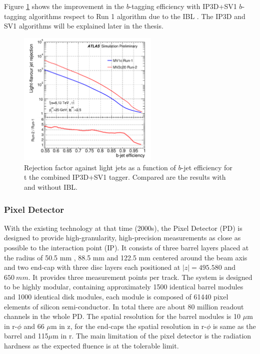 Figure \ref{fig:chap2:ATLAS:ITK:IBL:Btag} shows the improvement in the $b$-tagging efficiency with IP3D+SV1 $b$-tagging algorithms respect to Run 1 algorithm due to the IBL \cite{IBL_Btag, IBL_Btag2}. The IP3D and SV1 algorithms will be explained later in the thesis.
\begin{figure}[htbp]
    \centering
    \includegraphics[width=0.6\textwidth]{Ch2/Img/IBL_btag2.png}
    \caption{Rejection factor against light jets as a function of $b$-jet efficiency for t the combined IP3D+SV1 tagger. Compared are the results with and without IBL.}
    \label{fig:chap2:ATLAS:ITK:IBL:Btag}
\end{figure}
\subsubsection{Pixel Detector}
\label{chap2:ATLAS:ITK:PD}
With the existing technology at that time (2000s), the Pixel Detector (PD) is designed to provide high-granularity, high-precision measurements as close as possible to the interaction point (IP). It consists of three barrel layers placed at the radius of 50.5 mm , 88.5 mm and 122.5 mm centered around the beam axis and two end-cap with three disc layers each positioned at $|z|= 495.580$ and $650 \ mm$. It provides three measurement points per track. The system is designed to be highly modular, containing approximately 1500 identical barrel modules and 1000 identical disk modules, each module is composed of 61440 pixel elements of silicon semi-conductor. In total there are about 80 million readout channels in the whole PD. The spatial resolution for the barrel modules is 10 $\mu$m in r-$\phi$ and 66 $\mu$m in z, for the end-caps the spatial resolution in r-$\phi$ is same as the barrel and 115$\mu$m in r. The main limitation of the pixel detector is the radiation hardness as the expected fluence is at the tolerable limit. 
